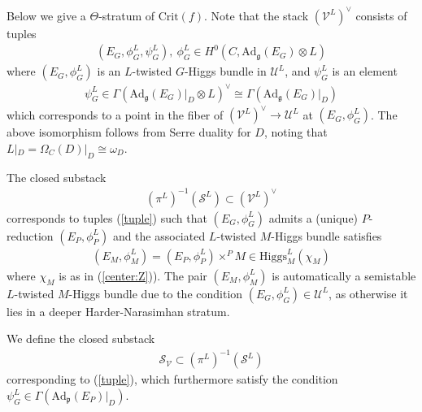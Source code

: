 \documentclass [11pt,oneside,a4paper,mathscr]{amsart}
\theoremstyle{definition}
\newcommand{\sS}{\mathcal{S}}
\newcommand{\U}{\mathcal{U}}
\newcommand{\V}{\mathcal{V}}
\newcommand{\Ad}{\mathrm{Ad}}
\newcommand{\Hig}{\mathrm{Higgs}}
\begin{document}
Below we give a $\Theta$-stratum of $\mathrm{Crit}(f)$. 
Note that the stack $(\mathcal{V}^L)^{\vee}$ 
consists of tuples
\begin{align}\label{tuple}
(E_G, \phi_G^{L}, \psi_G^{L}), \ \phi_G^{L} \in H^0(C, \Ad_{\mathfrak{g}}(E_G)\otimes L)
\end{align}
where $(E_G, \phi_G^{L})$ is an $L$-twisted $G$-Higgs bundle in $\U^L$, and 
$\psi_G^{L}$ is an element 
\begin{align*}
    \psi_G^{L} \in \Gamma(\Ad_{\mathfrak{g}}(E_G)|_{D} \otimes L)^{\vee} \cong \Gamma(\Ad_{\mathfrak{g}}(E_G)|_{D})
\end{align*}
which corresponds to a point in the fiber of $(\mathcal{V}^L)^{\vee} \to \mathcal{U}^L$ at $(E_G, \phi_G^{L})$. 
The above isomorphism follows from Serre duality for $D$, noting that 
$L|_{D}=\Omega_C(D)|_{D}\cong \omega_D$. 

The closed substack 
\begin{align*}(\pi^L)^{-1}(\sS^L) \subset (\V^L)^{\vee}
\end{align*}
corresponds to tuples (\ref{tuple})
such that $(E_G, \phi_G^{L})$ admits a (unique) $P$-reduction $(E_P, \phi_P^L)$ 
and the 
associated $L$-twisted $M$-Higgs bundle satisfies
\begin{align*}
(E_M, \phi_M^L)=(E_P, \phi_P^L)\times^P M \in \Hig_M^L(\chi_M)
\end{align*}
where $\chi_M$ is as in (\ref{center:Z})).
The pair $(E_M, \phi_M^L)$ is automatically a semistable $L$-twisted $M$-Higgs bundle 
due to the condition $(E_G, \phi_G^{L}) \in \U^L$, 
as otherwise it lies in a deeper Harder-Narasimhan stratum.

We define the closed substack 
\begin{align}\label{SV}
\sS_{\V} \subset (\pi^L)^{-1}(\sS^L)
\end{align}
corresponding to (\ref{tuple}), which furthermore 
satisfy the condition
$\psi_G^{L} \in \Gamma(\Ad_{\mathfrak{p}}(E_P)|_{D})$. 
\end{document}
